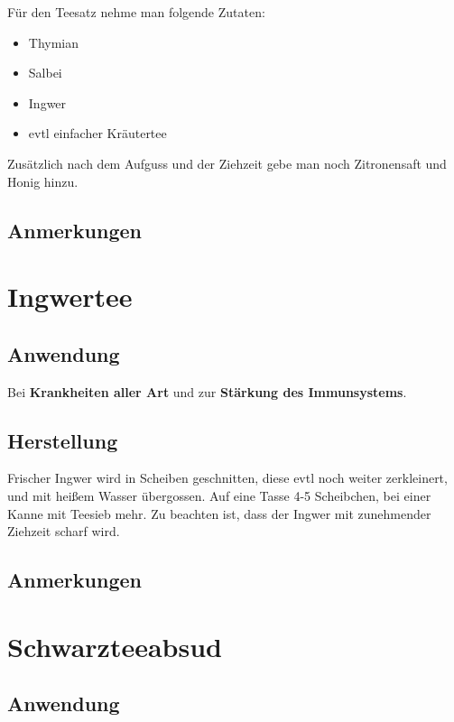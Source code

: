 Für den Teesatz nehme man folgende Zutaten:

\begin{itemize}
	\item Thymian
	\item Salbei
	\item Ingwer
	\item evtl einfacher Kräutertee
\end{itemize}

Zusätzlich nach dem Aufguss und der Ziehzeit gebe man noch Zitronensaft und Honig hinzu.

\subsection{Anmerkungen}



\section{Ingwertee}

\subsection{Anwendung}

Bei \textbf{Krankheiten aller Art} und zur \textbf{Stärkung des Immunsystems}.

\subsection{Herstellung}

Frischer Ingwer wird in Scheiben geschnitten, diese evtl noch weiter zerkleinert, und mit heißem Wasser übergossen. Auf eine Tasse 4-5 Scheibchen, bei einer Kanne mit Teesieb mehr. Zu beachten ist, dass der Ingwer mit zunehmender Ziehzeit scharf wird.

\subsection{Anmerkungen}




\section{Schwarzteeabsud}

\subsection{Anwendung}

